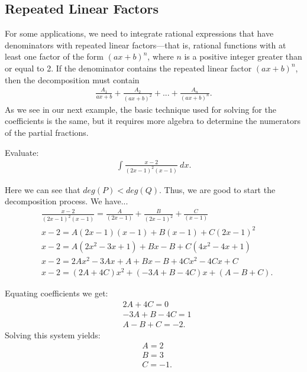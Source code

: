 \documentclass{report}
\begin{document}
     \subsection*{Repeated Linear Factors}
     \bigbreak \noindent 
     For some applications, we need to integrate rational expressions that have denominators with repeated linear factors—that is, rational functions with at least one factor of the form  $(ax+b)^{n} $, where  $n$ is a positive integer greater than or equal to  2. If the denominator contains the repeated linear factor  $(ax+b)^{n}$, then the decomposition must contain
     \begin{align*}
         \frac{A_{1}}{ax+b} + \frac{A_{2}}{(ax+b)^{2}} + ... + \frac{A_{n}}{(ax+b)^{n}}
     .\end{align*}
     \bigbreak \noindent 
     As we see in our next example, the basic technique used for solving for the coefficients is the same, but it requires more algebra to determine the numerators of the partial fractions.
     \bigbreak \noindent 
     \begin{eg}
         Evaluate:
         \begin{align*}
            \int \frac{x-2}{(2x-1)^{2}(x-1)}\ dx 
         .\end{align*}
     \end{eg}
     \bigbreak \noindent 
     \begin{minipage}[t]{0.47\textwidth}
     
     Here we can see that $deg(P) < deg(Q)$. Thus, we are good to start the decomposition process. We have...
     \begin{align*}
         &\frac{x-2}{(2x-1)^{2}(x-1)} = \frac{A}{(2x-1)} + \frac{B}{(2x-1)^{2}} + \frac{C}{(x-1)} \\
         &x-2 = A(2x-1)(x-1)+B(x-1) + C(2x-1)^{2} \\
         &x-2 = A(2x^{2}-3x+1)+Bx-B + C(4x^{2}-4x+1) \\
         &x-2  = 2Ax^{2}-3Ax + A + Bx - B + 4Cx^{2}-4Cx + C \\
         &x-2 = (2A+4C)x^{2} + (-3A+B-4C)x + (A -B + C)
     .\end{align*}
      \end{minipage}
      \begin{minipage}[t]{0.47\textwidth}
           Equating coefficients we get:
     \begin{align*}
        &2A + 4C = 0 \\
        &-3A + B - 4C= 1 \\
        &A-B+C = -2
     .\end{align*}
     Solving this system yields:
     \begin{align*}
         &A = 2 \\
         &B = 3 \\
         &C = -1
     .\end{align*}
      \end{minipage}
\end{document}
